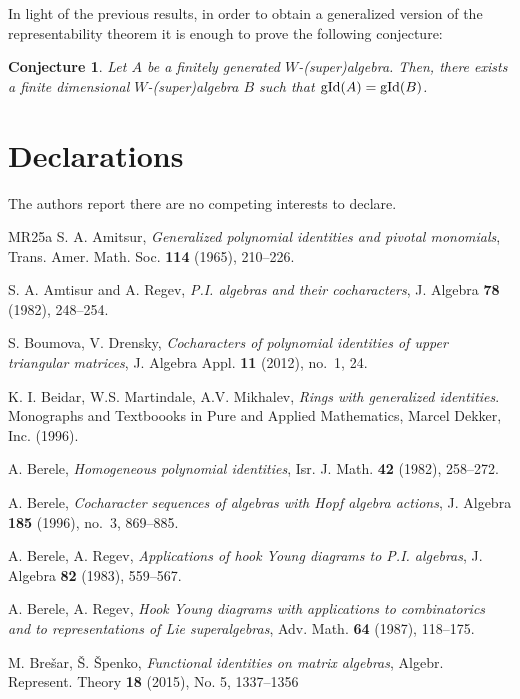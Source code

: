 \documentclass{article}
\newtheorem{conjecture}[theorem]{Conjecture}
\DeclareMathOperator{\gid}{\textnormal{gId}}
\begin{document}
In light of the previous results, in order to obtain a generalized version of the representability theorem it is enough to prove the following conjecture:

\begin{conjecture}
    Let $A$ be a finitely generated $W$-(super)algebra. Then, there exists a finite dimensional $W$-(super)algebra $B$ such that $\gid (A)=\gid(B)$.
\end{conjecture}

\section{Declarations}
The authors report there are no competing interests to declare.


\begin{thebibliography}{MR25a}
S. A. Amitsur, {\em Generalized polynomial identities and pivotal monomials}, Trans. Amer. Math. Soc. {\bf 114} (1965), 210--226.

S. A. Amtisur and A. Regev, {\em P.I. algebras and their cocharacters}, J. Algebra {\bf 78} (1982), 248--254.

S. Boumova, V. Drensky, \emph{Cocharacters of polynomial identities of upper triangular matrices}, J. Algebra Appl. \textbf{11} (2012), no.~1, 24.

K. I. Beidar, W.S. Martindale, A.V. Mikhalev, \emph{Rings with generalized identities}. Monographs and Textboooks in Pure and Applied Mathematics, Marcel Dekker, Inc. (1996).

A. Berele, \emph{Homogeneous polynomial identities}, Isr. J. Math. \textbf{42} (1982), 258--272.

A. Berele, \emph{Cocharacter sequences of algebras with {Hopf} algebra actions}, J. Algebra \textbf{185} (1996), no.~3, 869--885.

A. Berele, A. Regev, \emph{Applications of hook {Young} diagrams to {P.I.} algebras}, J. Algebra \textbf{82} (1983), 559--567.

A. Berele, A. Regev, \emph{Hook Young diagrams with applications to combinatorics and to representations of Lie superalgebras}, Adv. Math. \textbf{64} (1987), 118--175.

M. Brešar, Š. Špenko, \emph{Functional identities on matrix algebras}, Algebr. Represent. Theory \textbf{18} (2015), No. 5, 1337--1356 


\end{thebibliography}
\end{document}
